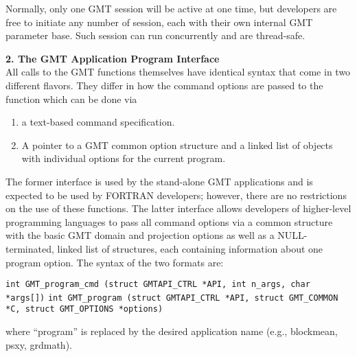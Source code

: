 \documentclass[12pt]{article}
\begin{document}
Normally, only one GMT session will be active at one time, but developers are free
to initiate any number of session, each with their own internal GMT parameter base.
Such session can run concurrently and are thread-safe.

{\bf 2. The GMT Application Program Interface}\\

All calls to the GMT functions themselves have identical syntax that come in two different flavors.
They differ in how the command options are passed to the function which can be done via
\begin{enumerate}
\item a text-based command specification.
\item A pointer to a GMT common option structure and a linked list of objects with individual options
for the current program.
\end{enumerate}

The former interface is used by the stand-alone GMT applications and is expected to be used by
FORTRAN developers; however, there are no restrictions on the use of these functions.  The
latter interface allows developers of higher-level programming languages to pass all command
options via a common structure with the basic GMT domain and projection options as well as a
NULL-terminated, linked list of structures, each containing information about one program option.
The syntax of the two formats are:

\texttt{int GMT\_program\_cmd (struct GMTAPI\_CTRL *API, int n\_args, char *args[])}
\texttt{int GMT\_program (struct GMTAPI\_CTRL *API, struct GMT\_COMMON *C, struct GMT\_OPTIONS *options)}

where ``program'' is replaced by the desired application name (e.g., blockmean, psxy, grdmath).
\end{document}
